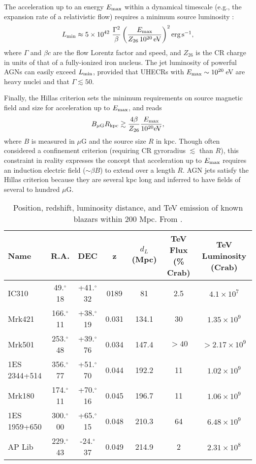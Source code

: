 \documentclass[3p,times,twocolumn]{elsarticle}
\newcommand{\s}{\,s$^{-1}$}
\newcommand\fdg{\mbox{$.\!\!^\circ$}}
\begin{document}
The acceleration up to an energy $E_{\rm max}$ within a dynamical timescale (e.g., the expansion rate of a relativistic flow) requires a minimum source luminosity \citep[][]{Waxman04}:
\begin{equation}\label{eq:Lcr}
L_{\rm min}\approx 5\times 10^{42}~\frac{\Gamma^2}{\beta}\left(\frac{E_{\rm max}}{Z_{26}\, 10^{20}{\rm \, eV}}\right)^2 \mbox{erg\s},
\end{equation}
where $\Gamma$ and $\beta c$ are the flow Lorentz factor and speed, and $Z_{26}$ is the CR charge in units of that of a fully-ionized iron nucleus.
The jet luminosity of powerful AGNs can easily exceed $L_{\rm min}$, provided that UHECRs with $E_{\rm max}\sim 10^{20}$\,eV are heavy nuclei and that $\Gamma\lesssim 50$.

Finally, the Hillas criterion \citep{hillas84} sets the minimum requirements on source magnetic field and size for acceleration up to $E_{\rm max}$, and reads
\begin{equation}\label{eq:hillas}
B_{\mu{\rm G}}R_{\rm kpc}\gtrsim \frac{4\beta}{Z_{26}}\frac{E_{\rm max}}{10^{20}{\rm eV}},
\end{equation}
where $B$ is measured in $\mu$G and the source size $R$ in kpc.
Though often considered a confinement criterion (requiring CR gyroradius $\lesssim$ than $R$), this constraint in reality expresses the concept that acceleration up to $E_{\rm max}$ requires an induction electric field ($\sim\beta B$) to extend over a length $R$.
AGN jets satisfy the Hillas criterion because they are several kpc long and inferred to have fields of several to hundred $\mu$G.


\begin{table*}[htp]
\caption{Position, redshift, luminosity distance, and TeV emission of known blazars within 200 Mpc. From \href{http://tevcat.uchicago.edu}{\color{blue}{\tt http://tevcat.uchicago.edu}}.}
\begin{center}
\begin{tabular}{|l|c|c|c|c|c|c|}
\hline
Name 			& R.A. 				& DEC 		& z			& $d_L$ (Mpc)	& TeV Flux (\% Crab)	& TeV Luminosity (Crab)\\
\hline
IC310			& 49\fdg 18			& +41\fdg 32	& 0189	& 81			& 2.5				& $4.1\times 10^7$\\
Mrk421 			& 166\fdg 11		& +38\fdg 19	& 0.031		& 134.1			& 30				& $1.35\times 10^9$\\
Mrk501	 		& 253\fdg 48		& +39\fdg 76	& 0.034		& 147.4			& $>40$				& $>2.17\times 10^9$\\
1ES 2344+514 	& 356\fdg 77		& +51\fdg 70	& 0.044		& 192.2			& 11				& $1.02\times 10^9$\\
Mrk180	 		& 174\fdg 11		& +70\fdg 16	& 0.045 	& 196.7			& 11				& $1.06\times 10^9$\\
1ES 1959+650 	& 300\fdg 00		& +65\fdg 15	& 0.048		& 210.3			& 64				& $6.48\times 10^9$\\
AP Lib			& 229\fdg 43		& -24\fdg 37	& 0.049		& 214.9			& 2					& $2.31\times 10^8$\\
\hline
\end{tabular}
\end{center}
\label{tab:blazar}
\end{table*}
\end{document}
